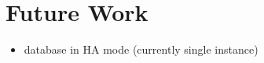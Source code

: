 \chapter{Future Work}

\begin{itemize}
	\item database in HA mode (currently single instance)
\end{itemize}